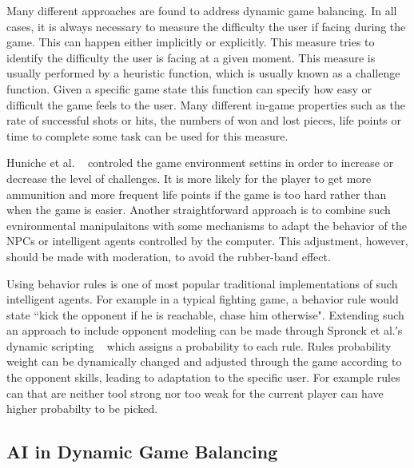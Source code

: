 Many different approaches are found to address dynamic game balancing. In all cases, it is always necessary to measure the difficulty the user if facing during the game. This can happen either implicitly or explicitly. This measure tries to identify the difficulty the user is facing at a given moment. This measure is usually performed by a heuristic function, which is usually known as a challenge function. Given a specific game state this function can specify how easy or difficult the game feels to the user. Many different in-game properties such as the rate of successful shots or hits, the numbers of won and lost pieces, life points or time to complete some task can be used for this measure.

Huniche et al. ~\cite{hunicke2004ai} controled the game environment settins in order to increase or decrease the level of challenges. It is more likely for the player to get more ammunition and more frequent life points if the game is too hard rather than when the game is easier. Another straightforward approach is to combine such evnironmental manipulaitons with some mechanisms to adapt the behavior of the NPCs or intelligent agents controlled by the computer. This adjustment, however, should be made with moderation, to avoid the rubber-band effect.

Using behavior rules is one of most popular traditional implementations of such intelligent agents. For example in a typical fighting game, a behavior rule would state ``kick the opponent if he is reachable, chase him otherwise". Extending such an approach to include opponent modeling can be made through Spronck et al.′s dynamic scripting ~\cite{spronck2004difficulty} which assigns a probability to each rule. Rules probability weight can be dynamically changed and adjusted through the game according to the opponent skills, leading to adaptation to the specific user. For example rules can that are neither tool strong nor too weak for the current player can have higher probabilty to be picked.

\subsection{AI in Dynamic Game Balancing}

